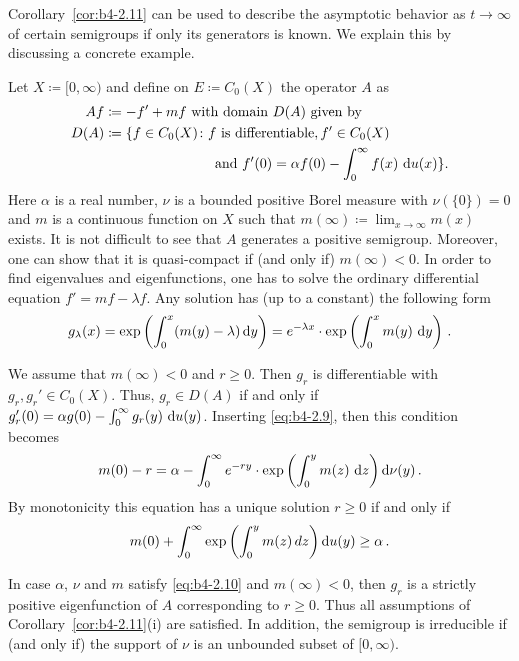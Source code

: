 Corollary~\ref{cor:b4-2.11} can be used to describe the asymptotic behavior as $t \to \infty$ of certain semigroups if only its generators is known. 
We explain this by discussing a concrete example.
\begin{example}\label{ex:b4-2.12}
	Let $X  \coloneq  [0,\infty)$ and define on $E  \coloneq  C_{0}(X)$ the operator $A$ as
	\begin{equation}\label{eq:b4-2.8}
		\begin{aligned}
		Af & \coloneq -f' + mf \text{ with domain } D(A) \text{ given by}	\\
		D(A) & \coloneq  \{f \in C_{0}(X) \colon f \text{ is differentiable}, f' \in C_{0}(X)\\
		& \phantom{aaaaaaaaaaaaaaa} \text{and } f'(0) = \alpha f(0) - \int_0^{\infty} f(x) \, \mathop{}\!\mathrm{d}{u}(x)
 \} \text{.}
		\end{aligned}
	\end{equation}
	Here $\alpha$ is a real number, $\nu$ is a bounded positive Borel measure with $\nu(\{0\}) = 0$ and $m$ is a continuous function on $X$ such that $m(\infty)  \coloneq  \lim_{x \to \infty}m(x)$ exists. 
    It is not difficult to see that $A$ generates a positive semigroup. 
    Moreover, one can show that it is quasi-compact if (and only if) $m(\infty) < 0$. In order to find 
%
%
eigenvalues and eigenfunctions, one has to solve the ordinary differential equation $f' = mf - \lambda f$. 
Any solution has (up to a constant) the following form
\begin{equation}\label{eq:b4-2.9}
	g_{\lambda}(x) = \exp\left(\int_0^x(m(y) - \lambda)\mathop{}\!\mathrm{d}{y} \right) = e^{-\lambda x} \cdot \exp\left(\int_0^x m(y) \, \mathop{}\!\mathrm{d}{y} \right)\,.
\end{equation}

We assume that $m(\infty) < 0$ and $r \geq 0$. 
Then $g_r$ is differentiable with $g_r, g_r' \in C_{0}(X)$. 
Thus, $g_r \in D(A)$ if and only if $g_r'(0) = \alpha g(0) - \int_0^{\infty} g_r(y) \, \mathop{}\!\mathrm{d}{u}(y)$. 
Inserting \eqref{eq:b4-2.9}, then this condition becomes
\[
m(0) - r = \alpha - \int_0^{\infty} e^{-ry} \cdot \exp\left(\int_{0}^{y}  m(z) \,\mathop{}\!\mathrm{d}{z}\right)\mathop{}\!\mathrm{d}{\nu}(y)\,.
\]
By monotonicity this equation has a unique solution $r \geq 0$ if and only if
\begin{equation}\label{eq:b4-2.10}
	m(0) + \int_0^{\infty} \exp\left(\int_0^y m(z) \, dz\right)\mathop{}\!\mathrm{d}{u}(y) \geq \alpha\,.
\end{equation}

In case $\alpha$, $\nu$ and $m$ satisfy \eqref{eq:b4-2.10} and $m(\infty) < 0$, then $g_r$ is a strictly positive eigenfunction of $A$ corresponding to $r \geq 0$. 
Thus all assumptions of Corollary~\ref{cor:b4-2.11}(i) are satisfied. 
In addition, the semigroup is irreducible if (and only if) the support of $\nu$ is an unbounded subset of $[0,\infty)$.
\end{example}


